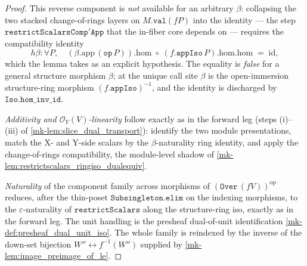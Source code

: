 \begin{proof}
  This reverse component is \emph{not} available for an arbitrary \(\beta\): collapsing the two
  stacked change-of-rings layers on \(M.\mathtt{val}(fP)\) into the identity --- the step
  \(\mathtt{restrictScalarsComp'App}\) that the in-fiber core depends on --- requires the
  compatibility identity
  \[
    h\beta : \forall P,\quad
      (\beta.\mathrm{app}\,(\mathtt{op}\,P)).\mathrm{hom}
        \;\circ\;
      (f.\mathtt{appIso}\,P).\mathrm{hom}.\mathrm{hom}
        \;=\;
      \mathrm{id},
  \]
  which the lemma takes as an explicit hypothesis. The equality is \emph{false} for a general
  structure morphism \(\beta\); at the unique call site \(\beta\) is the open-immersion
  structure-ring morphism \((f.\mathtt{appIso})^{-1}\), and the identity is discharged by
  \(\mathtt{Iso.hom\_inv\_id}\).

  \emph{Additivity and \(\mathcal{O}_Y(V)\)-linearity} follow exactly as in the forward leg
  (steps (i)--(iii) of \ref{mk-lem:slice_dual_transport}): identify the two module
  presentations, match the X- and Y-side scalars by the \(\beta\)-naturality ring identity,
  and apply the change-of-rings compatibility, the module-level shadow of
  \ref{mk-lem:restrictscalars_ringiso_dualequiv}.

  \emph{Naturality} of the component family across morphisms of \((\mathtt{Over}\,(fV))^{\mathrm{op}}\)
  reduces, after the thin-poset \(\mathtt{Subsingleton.elim}\) on the indexing morphisms, to
  the \(\varepsilon\)-naturality of \(\mathtt{restrictScalars}\) along the structure-ring iso,
  exactly as in the forward leg. The unit handling is the presheaf dual-of-unit
  identification \ref{mk-def:presheaf_dual_unit_iso}. The whole family is reindexed by the
  inverse of the down-set bijection \(W'' \leftrightarrow f^{-1}(W'')\) supplied by
  \ref{mk-lem:image_preimage_of_le}.
\end{proof}


